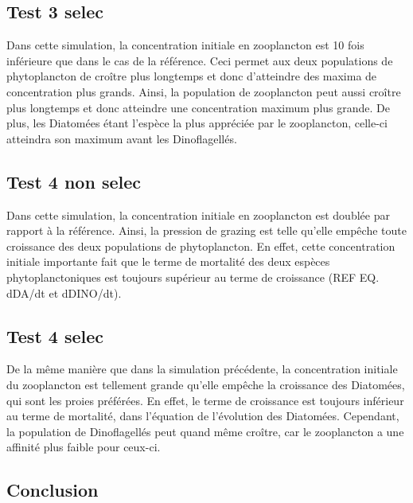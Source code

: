 \subsection{Test 3 selec}

Dans cette simulation, la concentration initiale en zooplancton est 10 fois inférieure que dans le cas de la référence. Ceci permet aux deux populations de phytoplancton de croître plus longtemps et donc d'atteindre des maxima de concentration plus grands. Ainsi, la population de zooplancton peut aussi croître plus longtemps et donc atteindre une concentration maximum plus grande. De plus, les Diatomées étant l'espèce la plus appréciée par le zooplancton, celle-ci atteindra son maximum avant les Dinoflagellés.

\subsection{Test 4 non selec}

Dans cette simulation, la concentration initiale en zooplancton est doublée par rapport à la référence. Ainsi, la pression de grazing est telle qu'elle empêche toute croissance des deux populations de phytoplancton. En effet, cette concentration initiale importante fait que le terme de mortalité des deux espèces phytoplanctoniques est toujours supérieur au terme de croissance (REF EQ. dDA/dt et dDINO/dt).

\subsection{Test 4 selec}

De la même manière que dans la simulation précédente, la concentration initiale du zooplancton est tellement grande qu'elle empêche la croissance des Diatomées, qui sont les proies préférées. En effet, le terme de croissance est toujours inférieur au terme de mortalité, dans l'équation de l'évolution des Diatomées. Cependant, la population de Dinoflagellés peut quand même croître, car le zooplancton a une affinité plus faible pour ceux-ci.

\subsection{Conclusion}


